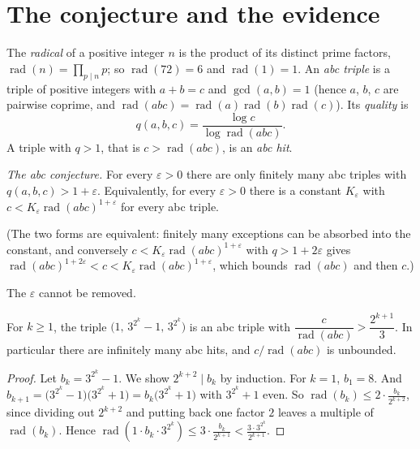 \section{The conjecture and the evidence}

The \emph{radical} of a positive integer $n$ is the product of its distinct prime factors, $\operatorname{rad}(n)=\prod_{p\mid n}p$; so $\operatorname{rad}(72)=6$
and $\operatorname{rad}(1)=1$. An \emph{abc triple} is a triple of positive integers with $a+b=c$ and $\gcd(a,b)=1$ (hence $a$, $b$, $c$ are pairwise
coprime, and $\operatorname{rad}(abc)=\operatorname{rad}(a)\operatorname{rad}(b)\operatorname{rad}(c)$). Its \emph{quality} is
\[
q(a,b,c)=\frac{\log c}{\log\operatorname{rad}(abc)}.
\]
A triple with $q>1$, that is $c>\operatorname{rad}(abc)$, is an \emph{abc hit}.

\begin{center}
\emph{The abc conjecture.} For every $\varepsilon>0$ there are only finitely many abc triples with $q(a,b,c)>1+\varepsilon$. Equivalently, for every
$\varepsilon>0$ there is a constant $K_\varepsilon$ with $c<K_\varepsilon\operatorname{rad}(abc)^{1+\varepsilon}$ for every abc triple.
\end{center}

(The two forms are equivalent: finitely many exceptions can be absorbed into the constant, and conversely $c<K_\varepsilon\operatorname{rad}(abc)^{1+\varepsilon}$
with $q>1+2\varepsilon$ gives $\operatorname{rad}(abc)^{1+2\varepsilon}<c<K_\varepsilon\operatorname{rad}(abc)^{1+\varepsilon}$, which bounds
$\operatorname{rad}(abc)$ and then $c$.)

The $\varepsilon$ cannot be removed.

\begin{proposition}\label{conjectures:prop:abcinf}
For $k\ge1$, the triple $\bigl(1,\,3^{2^k}-1,\,3^{2^k}\bigr)$ is an abc triple with $\dfrac c{\operatorname{rad}(abc)}>\dfrac{2^{k+1}}3$. In particular there are
infinitely many abc hits, and $c/\operatorname{rad}(abc)$ is unbounded.
\end{proposition}
\begin{proof}
Let $b_k=3^{2^k}-1$. We show $2^{k+2}\mid b_k$ by induction. For $k=1$, $b_1=8$. And $b_{k+1}=\bigl(3^{2^k}-1\bigr)\bigl(3^{2^k}+1\bigr)=b_k\bigl(3^{2^k}+1\bigr)$ with
$3^{2^k}+1$ even. So $\operatorname{rad}(b_k)\le2\cdot\frac{b_k}{2^{k+2}}$, since dividing out $2^{k+2}$ and putting back one factor $2$ leaves a multiple of
$\operatorname{rad}(b_k)$. Hence $\operatorname{rad}(1\cdot b_k\cdot3^{2^k})\le3\cdot\frac{b_k}{2^{k+1}}<\frac{3\cdot3^{2^k}}{2^{k+1}}$.
\end{proof}

